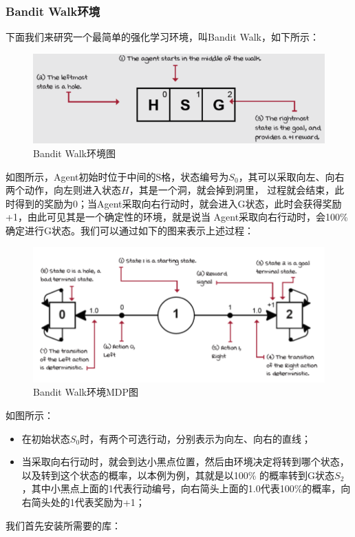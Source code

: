 \subsubsection{Bandit Walk环境}
下面我们来研究一个最简单的强化学习环境，叫Bandit Walk，如下所示：
\begin{figure}[H]
	\caption{Bandit Walk环境图}
	\label{p000002}
	\centering
	\includegraphics[width=15cm]{images/p000002}
\end{figure}
如图所示，Agent初始时位于中间的S格，状态编号为$S_{0}$，其可以采取向左、向右两个动作，向左则进入状态$H$，其是一个洞，就会掉到洞里，
过程就会结束，此时得到的奖励为0；当Agent采取向右行动时，就会进入G状态，此时会获得奖励+1，由此可见其是一个确定性的环境，就是说当
Agent采取向右行动时，会100\%确定进行G状态。我们可以通过如下的图来表示上述过程：
\begin{figure}[H]
	\caption{Bandit Walk环境MDP图}
	\label{p000003}
	\centering
	\includegraphics[width=15cm]{images/p000003}
\end{figure}
如图所示：
\begin{itemize}
    \item 在初始状态$S_{0}$时，有两个可选行动，分别表示为向左、向右的直线；
    \item 当采取向右行动时，就会到达小黑点位置，然后由环境决定将转到哪个状态，以及转到这个状态的概率，以本例为例，其就是以100\%
的概率转到G状态$S_{2}$，其中小黑点上面的1代表行动编号，向右简头上面的1.0代表100\%的概率，向右简头处的1代表奖励为+1；
\end{itemize}
我们首先安装所需要的库：
